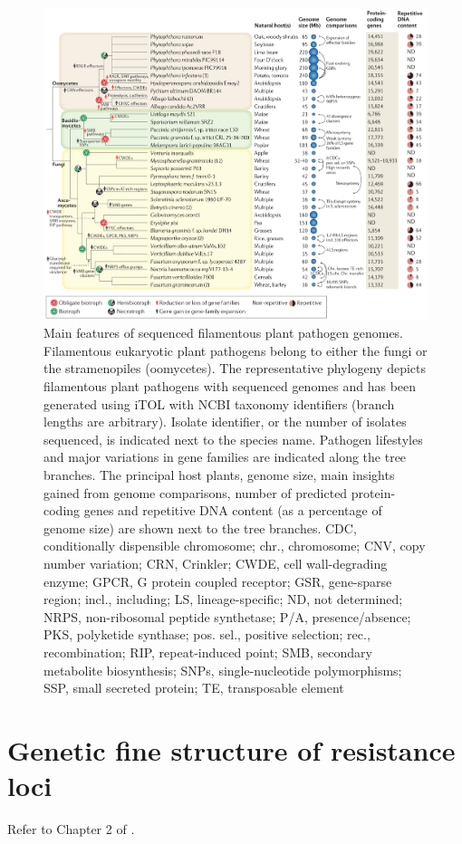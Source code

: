 \documentclass[11pt,dvipsnames,ignorenonframetext,aspectratio=169]{beamer}
\begin{document}
\begin{frame}{}
\protect\hypertarget{section-18}{}
\begin{figure}
\includegraphics[width=0.4\linewidth]{../images/genome_comparison_pathogenic_fungi} \caption{Main features of sequenced filamentous plant pathogen genomes. Filamentous eukaryotic plant pathogens belong to either the fungi or the stramenopiles (oomycetes). The representative phylogeny depicts filamentous plant pathogens with sequenced genomes and has been generated using iTOL with NCBI taxonomy identifiers (branch lengths are arbitrary). Isolate identifier, or the number of isolates sequenced, is indicated next to the species name. Pathogen lifestyles and major variations in gene families are indicated along the tree branches. The principal host plants, genome size, main insights gained from genome comparisons, number of predicted protein-coding genes and repetitive DNA content (as a percentage of genome size) are shown next to the tree branches. CDC, conditionally dispensible chromosome; chr., chromosome; CNV, copy number variation; CRN, Crinkler; CWDE, cell wall-degrading enzyme; GPCR, G protein coupled receptor; GSR, gene-sparse region; incl., including; LS, lineage-specific; ND, not determined; NRPS, non-ribosomal peptide synthetase; P/A, presence/absence; PKS, polyketide synthase; pos. sel., positive selection; rec., recombination; RIP, repeat-induced point; SMB, secondary metabolite biosynthesis; SNPs, single-nucleotide polymorphisms; SSP, small secreted protein; TE, transposable element}\label{fig:pathogenic-fungi-genome-compare}
\end{figure}
\end{frame}

\hypertarget{genetic-fine-structure-of-resistance-loci}{%
\section{Genetic fine structure of resistance
loci}\label{genetic-fine-structure-of-resistance-loci}}

\begin{frame}{}
\protect\hypertarget{section-19}{}
Refer to Chapter 2 of \citet{hulbert1997genetic}.
\end{frame}
\end{document}
